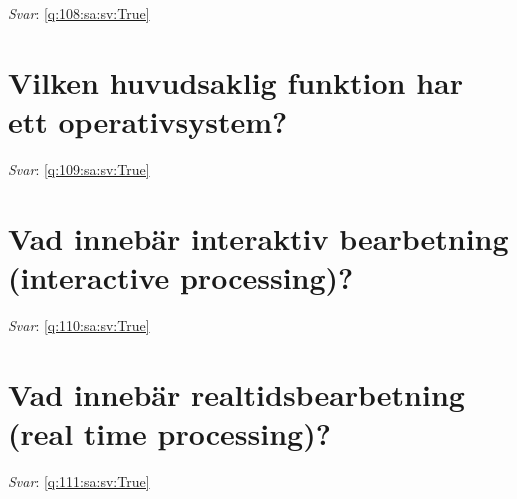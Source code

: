 \documentclass[a4paper,11pt,oneside]{book}
\begin{document}
\begin{sloppypar}
\label{q:108:sa:sv:False}

\vspace{2cm}

\noindent\makebox[\textwidth]{\hrulefill}

\vspace{1cm}

\textit{Svar}: \autoref{q:108:sa:sv:True}



\section{Vilken huvudsaklig funktion har ett operativsystem?}

\label{q:109:sa:sv:False}

\vspace{2cm}

\noindent\makebox[\textwidth]{\hrulefill}

\vspace{1cm}

\textit{Svar}: \autoref{q:109:sa:sv:True}



\section{Vad inneb\"ar interaktiv bearbetning (interactive processing)?}

\label{q:110:sa:sv:False}

\vspace{2cm}

\noindent\makebox[\textwidth]{\hrulefill}

\vspace{1cm}

\textit{Svar}: \autoref{q:110:sa:sv:True}



\section{Vad inneb\"ar realtidsbearbetning (real time processing)?}

\label{q:111:sa:sv:False}

\vspace{2cm}

\noindent\makebox[\textwidth]{\hrulefill}

\vspace{1cm}

\textit{Svar}: \autoref{q:111:sa:sv:True}




\end{sloppypar}
\end{document}
